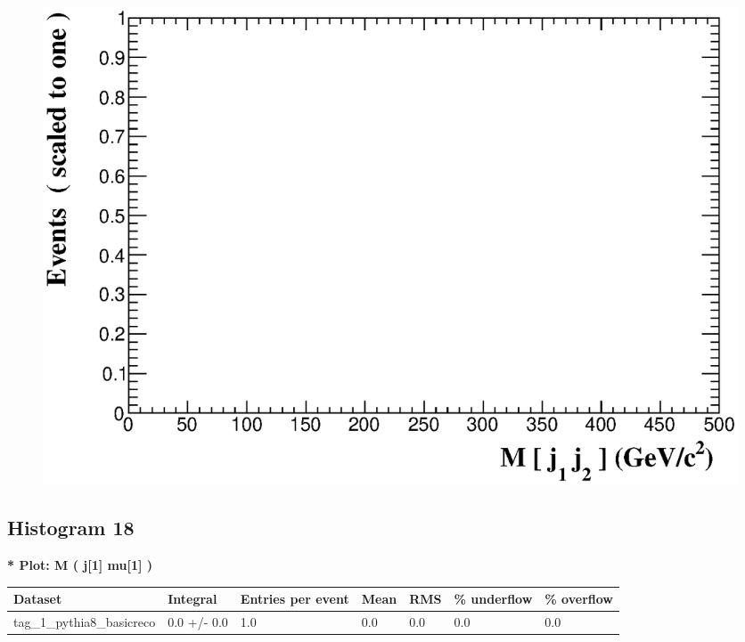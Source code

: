 \documentclass[a4paper, 10pt]{article}
\begin{document}
\begin{figure}[H]
  \begin{center}
    \includegraphics[scale=0.45]{selection_16.eps}\\
\caption{   }
  \end{center}
\end{figure}
      \newpage
\subsection{ Histogram 18}

\textbf{* Plot: M ( j[1] mu[1] ) }\\
   \begin{table}[H]
  \begin{center}
    \begin{tabular}{|m{23.0mm}|m{23.0mm}|m{18.0mm}|m{19.0mm}|m{19.0mm}|m{19.0mm}|m{19.0mm}|}
      \hline
      {\cellcolor{yellow}         Dataset}& {\cellcolor{yellow}         Integral}& {\cellcolor{yellow}         Entries per event}& {\cellcolor{yellow}         Mean}& {\cellcolor{yellow}         RMS}& {\cellcolor{yellow}         \% underflow}& {\cellcolor{yellow}         \% overflow}\\
      \hline
      {\cellcolor{white}         tag\_1\_pythia8\_basicreco}& {\cellcolor{white}         0.0 +/\-- 0.0}& {\cellcolor{white}         1.0}& {\cellcolor{white}         0.0}& {\cellcolor{white}         0.0}& {\cellcolor{green}         0.0}& {\cellcolor{green}         0.0}\\
\hline
    \end{tabular}
  \end{center}
\end{table}
\end{document}
